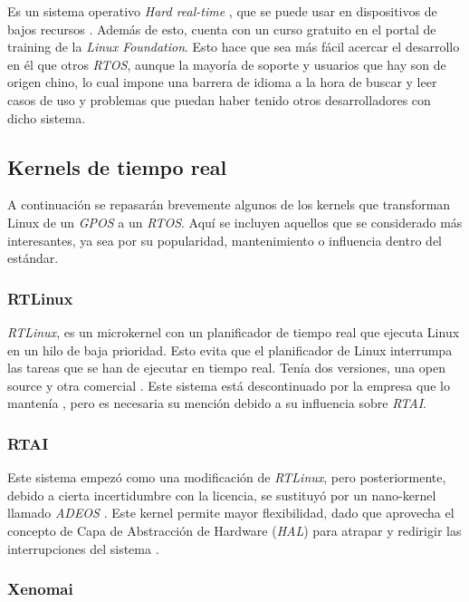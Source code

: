 Es un sistema operativo \textit{Hard real-time} \cite{RT-ThreadTeam2025}, que se puede usar en dispositivos de bajos recursos \cite{RT-ThreadTeam2024}. Además de esto, cuenta con un curso gratuito en el portal de training de la \textit{Linux Foundation}. Esto hace que sea más fácil acercar el desarrollo en él que otros \textit{RTOS}, aunque la mayoría de soporte y usuarios que hay son de origen chino, lo cual impone una barrera de idioma a la hora de buscar y leer casos de uso y problemas que puedan haber tenido otros desarrolladores con dicho sistema.


\subsection{Kernels de tiempo real\label{SS:KERNELS}}


A continuación se repasarán brevemente algunos de los kernels que transforman Linux de un \textit{GPOS} a un \textit{RTOS}. Aquí se incluyen aquellos que se considerado más interesantes, ya sea por su popularidad, mantenimiento o influencia dentro del estándar.


\subsubsection{RTLinux\label{SSS:RTLINUX}}


\textit{RTLinux}, es un microkernel con un planificador de tiempo real que ejecuta Linux en un hilo de baja prioridad. Esto evita que el planificador de Linux interrumpa las tareas que se han de ejecutar en tiempo real. Tenía dos versiones, una open source y otra comercial \cite{Buttazzo2024}. Este sistema está descontinuado por la empresa que lo mantenía \cite{EmbLogic2011}, pero es necesaria su mención debido a su influencia sobre \textit{RTAI}.


\subsubsection{RTAI\label{SSS:RTAI}}


Este sistema empezó como una modificación de \textit{RTLinux}, pero posteriormente, debido a cierta incertidumbre con la licencia, se sustituyó por un nano-kernel llamado \textit{ADEOS} \cite{KarimYaghmour2002}. Este kernel permite mayor flexibilidad, dado que aprovecha el concepto de Capa de Abstracción de Hardware (\textit{HAL}) para atrapar y redirigir las interrupciones del sistema \cite{Buttazzo2024}.


\subsubsection{Xenomai\label{SSS:XENOMAI}}


